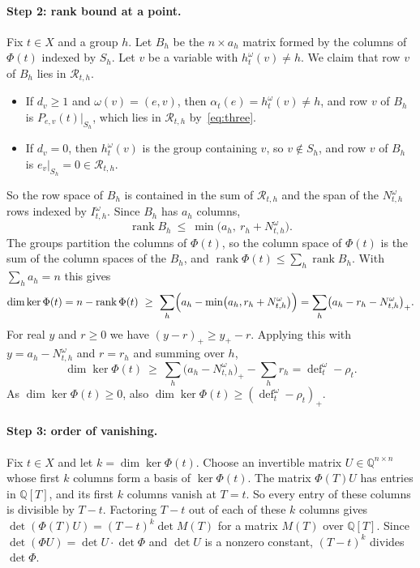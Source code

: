 \documentclass[11pt,a4paper]{article}
\theoremstyle{definition}
\theoremstyle{remark}
\newcommand{\Q}{\mathbb{Q}}
\newcommand{\cR}{\mathcal{R}}
\newcommand{\dfc}{\operatorname{def}}
\newcommand{\rank}{\operatorname{rank}}
\begin{document}
\paragraph{Step 2: rank bound at a point.} Fix $t\in X$ and a group $h$. Let $B_h$ be the
$n\times a_h$ matrix formed by the columns of $\Phi(t)$ indexed by $S_h$. Let $v$ be a
variable with $h^\omega_t(v)\ne h$. We claim that row $v$ of $B_h$ lies in $\cR_{t,h}$.
\begin{itemize}
\item If $d_v\ge1$ and $\omega(v)=(e,v)$, then $\alpha_t(e)=h^\omega_t(v)\ne h$, and row $v$
 of $B_h$ is $P_{e,v}(t)|_{S_h}$, which lies in $\cR_{t,h}$ by~\eqref{eq:three}.
\item If $d_v=0$, then $h^\omega_t(v)$ is the group containing $v$, so $v\notin S_h$, and
 row $v$ of $B_h$ is $e_v|_{S_h}=0\in\cR_{t,h}$.
\end{itemize}
So the row space of $B_h$ is contained in the sum of $\cR_{t,h}$ and the span of the
$N^\omega_{t,h}$ rows indexed by $I^\omega_{t,h}$. Since $B_h$ has $a_h$ columns,
\[
\rank B_h\ \le\ \min\bigl(a_h,\ r_h+N^\omega_{t,h}\bigr).
\]
The groups partition the columns of $\Phi(t)$, so the column space of $\Phi(t)$ is the sum
of the column spaces of the $B_h$, and $\rank\Phi(t)\le\sum_h\rank B_h$. With
$\sum_ha_h=n$ this gives
\[
\dim\ker\Phi(t)=n-\rank\Phi(t)\ \ge\ \sum_h\Bigl(a_h-\min\bigl(a_h,r_h+N^\omega_{t,h}\bigr)\Bigr)
=\sum_h\bigl(a_h-r_h-N^\omega_{t,h}\bigr)_+ .
\]
For real $y$ and $r\ge0$ we have $(y-r)_+\ge y_+-r$. Applying this with
$y=a_h-N^\omega_{t,h}$ and $r=r_h$ and summing over $h$,
\[
\dim\ker\Phi(t)\ \ge\ \sum_h\bigl(a_h-N^\omega_{t,h}\bigr)_+-\sum_hr_h=\dfc^\omega_t-\rho_t .
\]
As $\dim\ker\Phi(t)\ge0$, also $\dim\ker\Phi(t)\ge(\dfc^\omega_t-\rho_t)_+$.

\paragraph{Step 3: order of vanishing.} Fix $t\in X$ and let $k=\dim\ker\Phi(t)$. Choose an
invertible matrix $U\in\Q^{n\times n}$ whose first $k$ columns form a basis of
$\ker\Phi(t)$. The matrix $\Phi(T)U$ has entries in $\Q[T]$, and its first $k$ columns
vanish at $T=t$. So every entry of these columns is divisible by $T-t$. Factoring $T-t$ out
of each of these $k$ columns gives $\det(\Phi(T)U)=(T-t)^k\det M(T)$ for a matrix $M(T)$
over $\Q[T]$. Since $\det(\Phi U)=\det U\cdot\det\Phi$ and $\det U$ is a nonzero constant,
$(T-t)^{k}$ divides $\det\Phi$.
\end{document}
